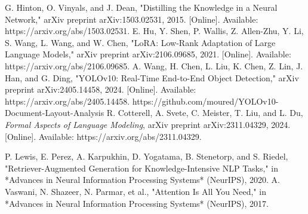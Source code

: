 \documentclass[13pt,a4paper]{article}
\begin{document}
\begin{thebibliography}{5}


G. Hinton, O. Vinyals, and J. Dean, "Distilling the Knowledge in a Neural Network," arXiv preprint arXiv:1503.02531, 2015. [Online]. Available: https://arxiv.org/abs/1503.02531. 
E. Hu, Y. Shen, P. Wallis, Z. Allen-Zhu, Y. Li, S. Wang, L. Wang, and W. Chen, "LoRA: Low-Rank Adaptation of Large Language Models," arXiv preprint arXiv:2106.09685, 2021. [Online]. Available: https://arxiv.org/abs/2106.09685.
A. Wang, H. Chen, L. Liu, K. Chen, Z. Lin, J. Han, and G. Ding, "YOLOv10: Real-Time End-to-End Object Detection," arXiv preprint arXiv:2405.14458, 2024. [Online]. Available: https://arxiv.org/abs/2405.14458.
https://github.com/moured/YOLOv10-Document-Layout-Analysis
R. Cotterell, A. Svete, C. Meister, T. Liu, and L. Du, \textit{Formal Aspects of Language Modeling}, arXiv preprint arXiv:2311.04329, 2024. [Online]. Available: https://arxiv.org/abs/2311.04329.

P. Lewis, E. Perez, A. Karpukhin, D. Yogatama, B. Stenetorp, and S. Riedel, "Retriever-Augmented Generation for Knowledge-Intensive NLP Tasks," in *Advances in Neural Information Processing Systems* (NeurIPS), 2020.
A. Vaswani, N. Shazeer, N. Parmar, et al., "Attention Is All You Need," in *Advances in Neural Information Processing Systems* (NeurIPS), 2017.



\end{thebibliography}
\end{document}
